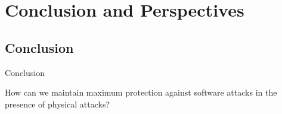 \section{Conclusion and Perspectives}


\subsection{Conclusion}
\begin{frame}{Conclusion}
    \begin{exampleblock}{}
        \centering
        How can we maintain maximum protection against software attacks in the presence of physical attacks?
    \end{exampleblock}
    

\end{frame}
